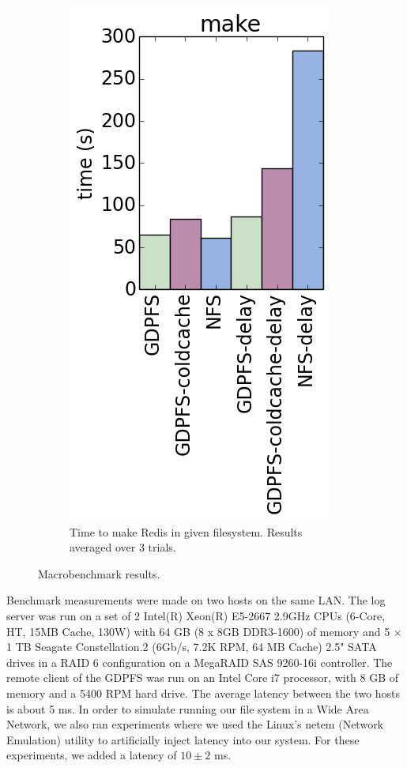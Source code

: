 \documentclass{acm_proc_article-sp}
\begin{document}
\begin{figure}[t]
\begin{subfigure}[b]{0.24\textwidth}
    \includegraphics[width=.8\columnwidth]{make.png}
    \caption{Time to make Redis in given filesystem. Results averaged over 3 trials.\label{fig:make}}
  \end{subfigure}
  \caption{Macrobenchmark results.}
\end{figure}

Benchmark measurements were made on two hosts on the same LAN. The log server was run on a set of 2 Intel(R) Xeon(R) E5-2667 2.9GHz CPUs (6-Core, HT, 15MB Cache, 130W) with 64 GB (8 x 8GB DDR3-1600) of memory and 5 $\times$ 1 TB Seagate Constellation.2 (6Gb/s, 7.2K RPM, 64 MB Cache) 2.5" SATA drives in a RAID 6 configuration on a MegaRAID SAS 9260-16i controller. The remote client of the GDPFS was run on an Intel Core i7 processor, with 8 GB of memory and a 5400 RPM hard drive. The average latency between the two hosts is about 5 ms. In order to simulate running our file system in a Wide Area Network, we also ran experiments where we used the Linux's netem (Network Emulation) utility to artificially inject latency into our system. For these experiments, we added a latency of $10 \pm 2$ ms.
\end{document}
